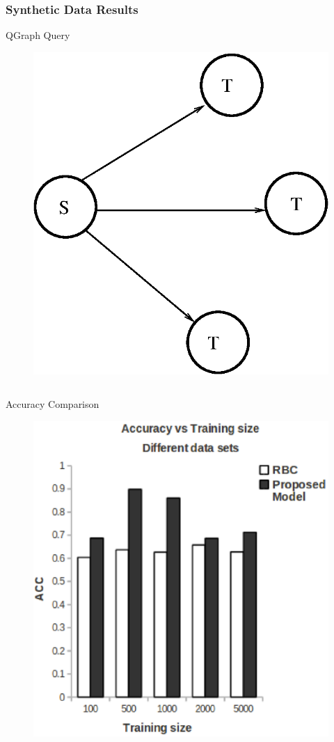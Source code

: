 \documentclass[10pt, blue,subsection=true, compress]{beamer}
\begin{document}
\begin{frame}\frametitle{Synthetic Data Results}
\begin{block}{QGraph Query}
\begin{figure}[htbp]
\centering
\includegraphics[scale=0.15]{img/container2d.eps}
\end{figure}
\end{block}
\begin{columns}[t]
\begin{block}{Accuracy Comparison}
\begin{figure}[htbp]
\centering
\includegraphics[scale=0.25]{img/ex2-acc.eps}

\end{figure}
\end{block}
\end{columns}
\end{frame}
\end{document}

